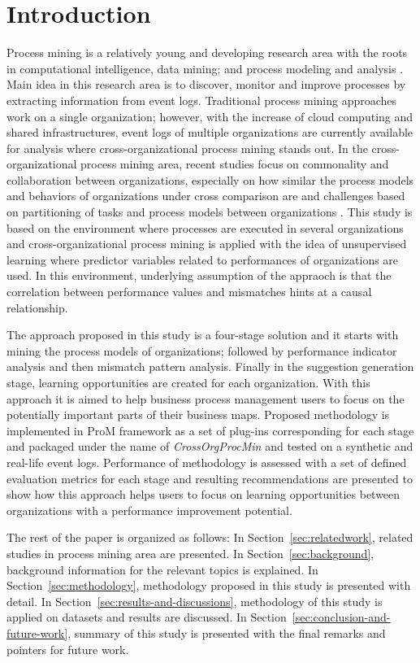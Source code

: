 \section{Introduction}
\label{sec:introduction}

Process mining is a relatively young and developing research area with the roots in computational intelligence, data mining; and process modeling and analysis \cite{van2012process}. Main idea in this research area is to discover, monitor and improve processes by extracting information from event logs. Traditional process mining approaches work on a single organization; however, with the increase of cloud computing and shared infrastructures, event logs of multiple organizations are currently available for analysis where cross-organizational process mining stands out. In the cross-organizational process mining area, recent studies focus on commonality and collaboration between organizations, especially on how similar the process models and behaviors of organizations under cross comparison are \cite{buijs2012towards} and challenges based on partitioning of tasks and process models between organizations \cite{van2011intra}. This study is based on the environment where processes are executed in several organizations and cross-organizational process mining is applied with the idea of unsupervised learning where predictor variables related to performances of organizations are used. In this environment, underlying assumption of the appraoch is that the correlation between performance values and mismatches hints at a causal relationship.

The approach proposed in this study is a four-stage solution and it starts with mining the process models of organizations; followed by performance indicator analysis and then mismatch pattern analysis. Finally in the suggestion generation stage, learning opportunities are created for each organization. With this approach it is aimed to help business process management users to focus on the potentially important parts of their business maps. Proposed methodology is implemented in ProM framework \cite{verbeek2010prom} as a set of plug-ins corresponding for each stage and packaged under the name of \textit{CrossOrgProcMin} and tested on a synthetic and real-life event logs. Performance of methodology is assessed with a set of defined evaluation metrics for each stage and resulting recommendations are presented to show how this approach helps users to focus on learning opportunities between organizations with a performance improvement potential.

The rest of the paper is organized as follows: In Section~\ref{sec:relatedwork}, related studies in process mining area are presented. In Section~\ref{sec:background}, background information for the relevant topics is explained. In Section~\ref{sec:methodology}, methodology proposed in this study is presented with detail. In Section~\ref{sec:results-and-discussions}, methodology of this study is applied on datasets and results are discussed. In Section~\ref{sec:conclusion-and-future-work}, summary of this study is presented with the final remarks and pointers for future work. 